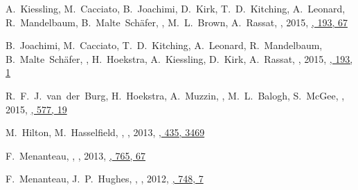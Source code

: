 \item
A.~Kiessling, M.~Cacciato, B.~Joachimi, D.~Kirk, T.~D.~Kitching, A.~Leonard, 
R.~Mandelbaum, B.~Malte~Sch\"afer, \myself, M.~L.~Brown, A.~Rassat,
,
2015, \href{https://ui.adsabs.harvard.edu/abs/2015SSRv..193...67K/abstract}{\ssr, 193, 67}

\item
B.~Joachimi, M.~Cacciato, T.~D.~Kitching, A.~Leonard, R.~Mandelbaum, 
B.~Malte~Sch\"afer, \myself, H.~Hoekstra, A.~Kiessling, D.~Kirk, A.~Rassat,
,
2015, \href{https://ui.adsabs.harvard.edu/abs/2015SSRv..193....1J/abstract}{\ssr, 193, 1}

\item
R.~F.~J.~van~der~Burg, H.~Hoekstra, A.~Muzzin, \myself, M.~L.~Balogh, S.~McGee,
,
2015, \href{https://ui.adsabs.harvard.edu/abs/2015A&A...577A..19V}{\aap, 577, 19}

\item
M.~Hilton, M.~Hasselfield, \myself, 
,
2013, \href{https://ui.adsabs.harvard.edu/abs/2013MNRAS.435.3469H/abstract}{\mnras, 435, 3469}

\item
F.~Menanteau, \myself, 
,
2013, \href{https://ui.adsabs.harvard.edu/abs/2013ApJ...765...67M/abstract}{\apj, 765, 67}

\item
F.~Menanteau, J.~P.~Hughes, \myself, 
,
2012, \href{https://ui.adsabs.harvard.edu/abs/2012ApJ...748....7M/abstract}{\apj, 748, 7}

